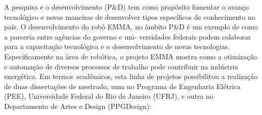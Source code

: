 A pesquisa e o desenvolvimento (P\&D) tem como propósito fomentar o avanço
tecnológico e novas maneiras de desenvolver tipos específicos de conhecimento
no país. O desenvolvimento do robô EMMA, no âmbito P\&D é um exemplo de como a
parceria entre agências do governo e uni- versidades federais podem colaborar
para a capacitação tecnológica e o desenvolvimento de novas tecnologias.
Especificamente na área de robótica, o projeto EMMA mostra como a otimização e
automação de diversos processos de trabalho pode contribuir na indústria
energética. Em termos acadêmicos, esta linha de projetos possibilitou a
realização de duas
dissertações de mestrado, uma no Programa de Engenharia Elétrica (PEE),
Universidade Federal do Rio de Janeiro (UFRJ), e outra no Departamento
de Artes e Design (PPGDesign):%


%

%
%
